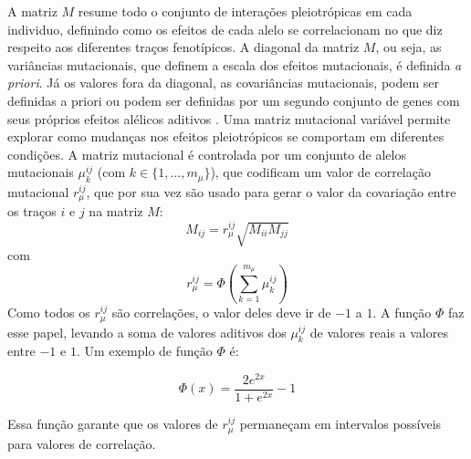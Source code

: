 A matriz $M$ resume todo o conjunto de interações pleiotrópicas em cada
individuo, definindo como os efeitos de cada alelo se correlacionam no
que diz respeito aos diferentes traços fenotípicos.
A diagonal da matriz $M$, ou seja, as variâncias mutacionais, que
definem a escala dos efeitos mutacionais, é definida {\it a priori}.
Já os valores fora da diagonal, as covariâncias mutacionais, podem ser
definidas a priori \citep{Jones2003, Jones2004} ou podem ser definidas
por um segundo conjunto de genes com seus próprios efeitos alélicos
aditivos \citep{Jones2007}.
Uma matriz mutacional variável permite explorar como mudanças nos
efeitos pleiotrópicos se comportam em diferentes condições.
A matriz mutacional é controlada por um conjunto de alelos mutacionais
$\mu^{ij}_k$ (com $k \in \{1,\ldots,m_\mu\}$), que codificam um valor de
correlação mutacional $r_\mu^{ij}$, que por sua vez são usado para gerar
o valor da covariação entre os traços $i$ e $j$ na matriz $M$:
\begin{equation}
M_{ij} = r_\mu^{ij} \sqrt {M_{ii}M_{jj}}
\end{equation}
com
\begin{equation}
r_\mu^{ij} = \Phi \left(\sum_{k=1}^{m_\mu} \mu^{ij}_k\right)
\end{equation}
Como todos os $r_\mu^{ij}$ são correlações, o valor deles deve ir de
$-1$ a $1$.
A função $\Phi$ faz esse papel, levando a soma de valores
aditivos dos $\mu^{ij}_k$ de valores reais a valores entre $-1$ e $1$.
Um exemplo de função $\Phi$ \citep[usado em][]{Jones2007} é:

\begin{equation}
\Phi (x) = \frac{2e^{2x}}{1+e^{2x}} - 1
\end{equation}

Essa função garante que os valores de $r_\mu^{ij}$ permaneçam em
intervalos possíveis para valores de correlação.


